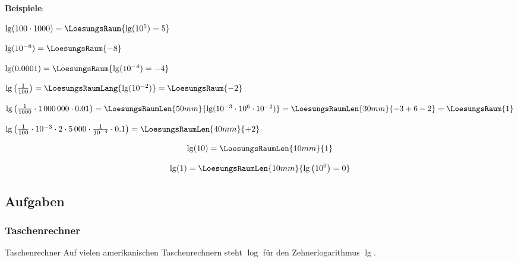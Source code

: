 \textbf{Beispiele}:\\
\leserluft{}

$\lg(100 \cdot{} 1000) = \LoesungsRaum{\lg(10^5)=5}$
\leserluft{}

$\lg(10^{-8}) = \LoesungsRaum{-8}$
\leserluft{}

$\lg(0.0001) = \LoesungsRaum{\lg(10^{-4})=-4}$

$\lg\left(\frac1{100}\right) =\LoesungsRaumLang{\lg(10^{-2}) } = \LoesungsRaum{-2}$
\leserluft{}

$\lg\left(\frac1{1000}\cdot{} 1\,000\,000 \cdot{} 0.01\right)
=\LoesungsRaumLen{50mm}{\lg(10^{-3} \cdot{} 10^6 \cdot{} 10^{-2}) } =
\LoesungsRaumLen{30mm}{-3 + 6 - 2} = \LoesungsRaum{1}$

$\lg\left(\frac1{100}\cdot{}10^{-3}\cdot{}2\cdot{} 5\,000 \cdot{} \frac1{10^{-4}}\cdot{} 0.1\right) = \LoesungsRaumLen{40mm}{+2}$

\newpage

\begin{gesetz}{}{}
$$\lg(10) = \LoesungsRaumLen{10mm}{1}$$
\end{gesetz}

\begin{gesetz}{}{}
$$\lg(1) = \LoesungsRaumLen{10mm}{\lg\left(10^0\right) = 0}$$
\end{gesetz}

\subsection*{Aufgaben}

\newpage

\subsubsection{Taschenrechner}
\begin{bemerkung}{Taschenrechner}{}
  Auf vielen amerikanischen Taschenrechnern steht $\log$ für den Zehnerlogarithmus $\lg$.

  
  \end{bemerkung}

